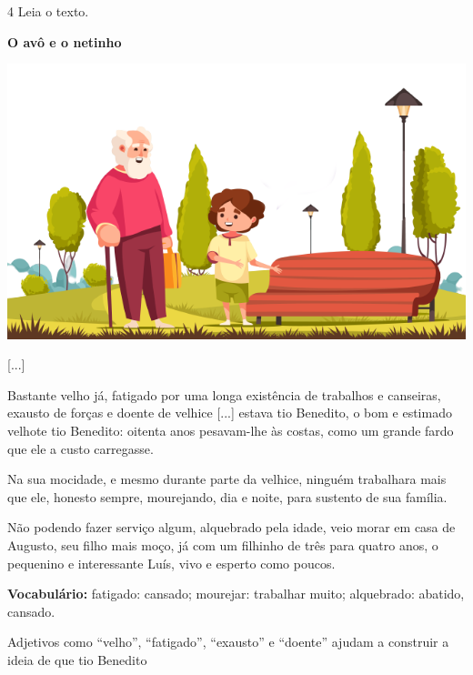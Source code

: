 \num{4} Leia o texto.

\begin{myquote}
\textbf{O avô e o netinho}

\begin{center}
\includegraphics[width=\textwidth]{./media/image23s.png}
\end{center}

{[}...{]}

Bastante velho já, fatigado por uma longa existência de trabalhos e
canseiras, exausto de forças e doente de velhice {[}...{]} 
estava tio Benedito, o bom e estimado velhote tio
Benedito: oitenta anos pesavam-lhe às costas, como um grande fardo que
ele a custo carregasse.

Na sua mocidade, e mesmo durante parte da velhice, ninguém trabalhara
mais que ele, honesto sempre, mourejando, dia e noite, para sustento de
sua família.

Não podendo fazer serviço algum, alquebrado pela idade, veio morar em
casa de Augusto, seu filho mais moço, já com um filhinho de três para
quatro anos, o pequenino e interessante Luís, vivo e esperto como
poucos.


\begin{small}
\textbf{Vocabulário:} fatigado: cansado; mourejar: trabalhar muito; alquebrado: abatido, cansado.
\end{small}
\end{myquote}


Adjetivos como ``velho'', ``fatigado'', ``exausto'' e ``doente'' ajudam a construir a ideia de que tio Benedito

